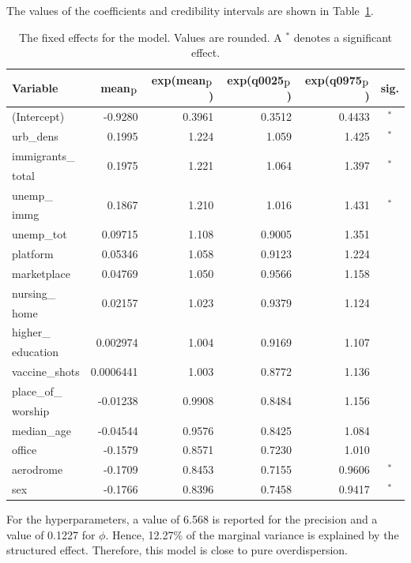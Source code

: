 The values of the coefficients and credibility intervals are shown in Table~\ref{fixedAllNorway_spatial}.
\begin{table}[H]
\caption{The fixed effects for the model. Values are rounded. A $^*$ denotes a significant effect. \label{fixedAllNorway_spatial}}
\begin{tabular}{l r r r r c}
\toprule
\textbf{Variable}	& \textbf{mean$_{\hbox{p}}$}	& \textbf{exp(mean$_{\hbox{p}}$)} & \textbf{exp(q0025$_{\hbox{p}}$)} & \textbf{exp(q0975$_{\hbox{p}}$)} & \textbf{sig.}\\
\midrule
(Intercept) & -0.9280 & 0.3961 & 0.3512 & 0.4433 & $^*$ \\
urb\_dens & 0.1995 & 1.224 & 1.059 & 1.425 & $^*$ \\
immigrants\_ & \multirow{2}{*}{0.1975}& \multirow{2}{*}{1.221}& \multirow{2}{*}{1.064}& \multirow{2}{*}{1.397}& \multirow{2}{*}{$^*$}\\
total \\
unemp\_ & \multirow{2}{*}{0.1867} & \multirow{2}{*}{1.210} & \multirow{2}{*}{1.016} & \multirow{2}{*}{1.431} & \multirow{2}{*}{$^*$} \\
immg\\
unemp\_tot & 0.09715 & 1.108 & 0.9005 & 1.351 \\
platform & 0.05346 & 1.058 & 0.9123 & 1.224 \\
marketplace & 0.04769 & 1.050 & 0.9566 & 1.158 \\
nursing\_ & \multirow{2}{*}{0.02157} & \multirow{2}{*}{1.023} & \multirow{2}{*}{0.9379} & \multirow{2}{*}{1.124} \\
home\\
higher\_ & \multirow{2}{*}{0.002974}& \multirow{2}{*}{1.004}& \multirow{2}{*}{0.9169}& \multirow{2}{*}{1.107}\\ 
education \\
vaccine\_shots & 0.0006441 & 1.003 & 0.8772 & 1.136\\
place\_of\_ & \multirow{2}{*}{-0.01238}& \multirow{2}{*}{0.9908}& \multirow{2}{*}{0.8484}& \multirow{2}{*}{1.156} \\
worship \\
median\_age & -0.04544 & 0.9576 & 0.8425 & 1.084 \\
office & -0.1579 & 0.8571 & 0.7230 & 1.010 \\
aerodrome & -0.1709 & 0.8453 & 0.7155 & 0.9606 & $^*$ \\
sex & -0.1766 & 0.8396 & 0.7458 & 0.9417 & $^*$ \\
\bottomrule
\end{tabular}
\end{table}
For the hyperparameters, a value of 6.568 is reported for the precision and a value of 0.1227 for $\phi$. Hence, 12.27\% of the marginal variance is explained by the structured effect. Therefore, this model is close to pure overdispersion.
\clearpage
